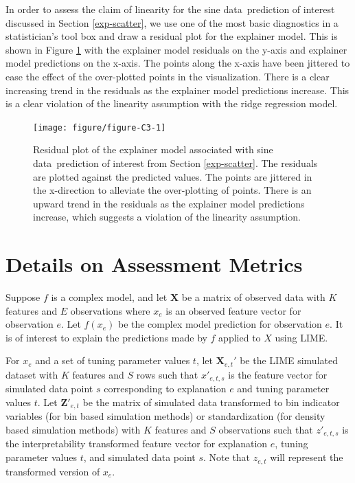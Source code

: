 \documentclass[AMS,STIX2COL]{WileyNJD-v2}\usepackage[]{graphicx}\usepackage[]{color}
\newenvironment{knitrout}{}{} %
\newcommand{\data}{sine data}
\begin{document}
In order to assess the claim of linearity for the \data \ prediction of interest discussed in Section \ref{exp-scatter}, we use one of the most basic diagnostics in a statistician's tool box and draw a residual plot for the explainer model. This is shown in Figure \ref{fig:figure-C3} with the explainer model residuals on the y-axis and explainer model predictions on the x-axis. The points along the x-axis have been jittered to ease the effect of the over-plotted points in the visualization. There is a clear increasing trend in the residuals as the explainer model predictions increase. This is a clear violation of the linearity assumption with the ridge regression model.

\begin{figure}[!thp]
\begin{knitrout}
\color{fgcolor}

{\centering \texttt{[image: figure/figure-C3-1]} 

}



\end{knitrout}
\caption{Residual plot of the explainer model associated with \data \ prediction of interest from Section \ref{exp-scatter}. The residuals are plotted against the predicted values. The points are jittered in the x-direction to alleviate the over-plotting of points. There is an upward trend in the residuals as the explainer model predictions increase, which suggests a violation of the linearity assumption.}
\label{fig:figure-C3}
\end{figure}

\section{Details on Assessment Metrics} \label{metric-details}

Suppose $f$ is a complex model, and let $\textbf{X}$ be a matrix of observed data with $K$ features and $E$ observations where $x_e$ is an observed feature vector for observation $e$. Let $f(x_e)$ be the complex model prediction for observation $e$. It is of interest to explain the predictions made by $f$ applied to $X$ using LIME. 

For $x_e$ and a set of tuning parameter values $t$, let $\textbf{X}_{e,t}'$ be the LIME simulated dataset with $K$ features and $S$ rows such that $x'_{e,t,s}$ is the feature vector for simulated data point $s$ corresponding to explanation $e$ and tuning parameter values $t$. Let $\textbf{Z}'_{e,t}$ be the matrix of simulated data transformed to bin indicator variables (for bin based simulation methods) or standardization (for density based simulation methods) with $K$ features and $S$ observations such that $z'_{e,t,s}$ is the interpretability transformed feature vector for explanation $e$, tuning parameter values $t$, and simulated data point $s$. Note that $z_{e,t}$ will represent the  transformed version of $x_e$.
\end{document}
